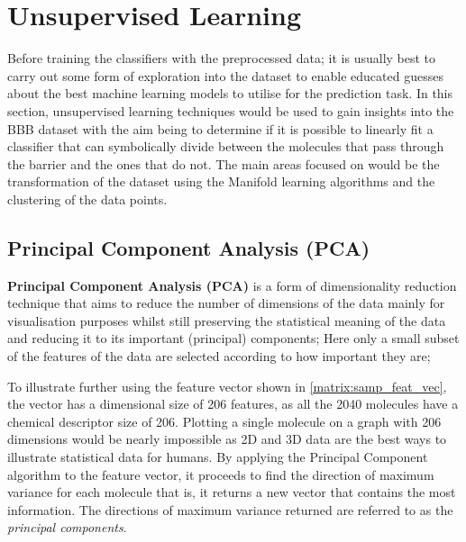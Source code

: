 \documentclass[a4paper,12pt]{report}
\begin{document}
	
	
	
	
	\section{Unsupervised Learning}
	Before training the classifiers with the preprocessed data; it is usually best to carry out some form of exploration into the dataset to enable educated guesses about the best machine learning models to utilise for the prediction task. In this section, unsupervised learning techniques would be used to gain insights into the BBB dataset with the aim being to determine if it is possible to linearly fit a classifier that can symbolically divide between the molecules that pass through the barrier and the ones that do not. The main areas focused on would be the transformation of the dataset using the Manifold learning algorithms and the clustering of the data points.
	
		\subsection{Principal Component Analysis (PCA)}
		\textbf{Principal Component Analysis (PCA)} is a form of dimensionality reduction technique that aims to reduce the number of dimensions of the data mainly for visualisation purposes whilst still preserving the statistical meaning of the data and reducing it to its important (principal) components; Here only a small subset of the features of the data are selected according to how important they are; 
		
		To illustrate further using the feature vector shown in \ref{matrix:samp_feat_vec}, the vector has a dimensional size of 206 features, as all the 2040 molecules have a chemical descriptor size of 206. Plotting a single molecule on a graph with 206 dimensions would be nearly impossible as 2D and 3D data are the best ways to illustrate statistical data for humans. By applying the Principal Component algorithm to the feature vector, it proceeds to find the direction of maximum variance for each molecule that is, it returns a new vector that contains the most information. The directions of maximum variance returned are referred to as the \textit{principal components}.
		
\end{document}
